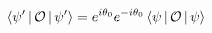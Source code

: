 \documentclass[preview]{standalone}
\begin{document}
\begin{align*}
\Braket{\psi '|\mathcal{O}|\psi '} = e^{i \theta_0}e^{-i \theta_0}\Braket{\psi  |\mathcal{O}|\psi }
\end{align*}
\end{document}
